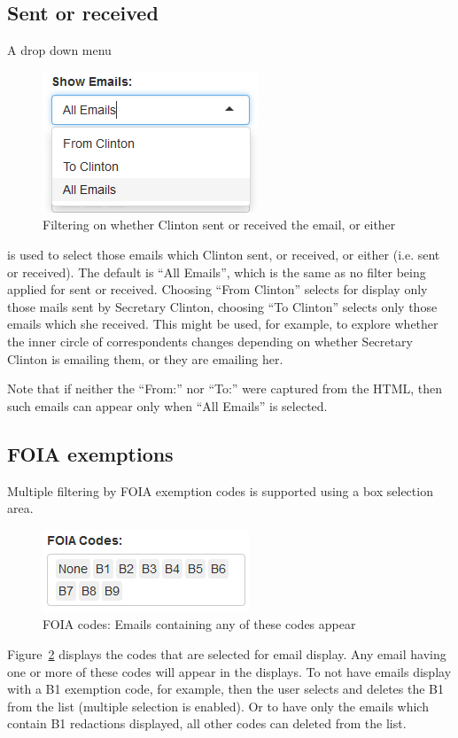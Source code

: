\documentclass[journal]{vgtc}                %
\begin{document}
\subsection{Sent or received}
A drop down menu 
\begin{figure}[h]
\begin{center}
\includegraphics[width=0.35\linewidth]{ToFromImage}
\caption{Filtering on whether Clinton sent or received the email, or either}
\label{fig:toFromFilter}
\end{center}
\end{figure}
is used to select those emails which Clinton sent, or received, or either (i.e. sent or received).  The default is ``All Emails'', which is the same as no filter being applied for sent or received.  Choosing ``From Clinton'' selects for display only those mails sent by Secretary Clinton, choosing ``To  Clinton'' selects only those emails which she received.  This might be used, for example, to explore whether the inner circle of correspondents changes depending on whether Secretary Clinton is emailing them, or they are emailing her.

Note that if neither the ``From:''  nor ``To:''  were captured from the HTML, then such emails can appear only when ``All Emails'' is selected.


\subsection{FOIA exemptions}
Multiple filtering by FOIA exemption codes is supported using a box selection area. 
\begin{figure}[h]
\begin{center}
\includegraphics[width=0.55\linewidth]{FOIABoxImage}
\caption{FOIA codes:  Emails containing any of these codes appear}
\label{fig:selectFOIA}
\end{center}
\end{figure}
Figure~\ref{fig:selectFOIA} displays the codes that are selected for email display.  Any email having one or more of these codes will appear in the displays.  To not have emails display with a B1 exemption code, for example, then the user selects and deletes the B1 from the list (multiple selection is enabled).  Or to have only the emails which  contain B1 redactions displayed, all other codes can deleted from the list.  
\end{document}

